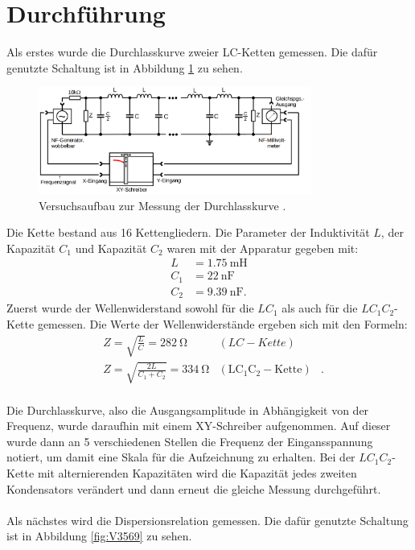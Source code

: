 \documentclass[
  bibliography=totoc,     %
  captions=tableheading,  %
  titlepage=firstiscover, %
]{scrartcl}
\begin{document}
\section{Durchführung}
\label{durchführung}
Als erstes wurde die Durchlasskurve zweier LC-Ketten gemessen. Die dafür
genutzte Schaltung ist in Abbildung \ref{fig:V3568} zu sehen.
\begin{figure}[htb]
  \centering
  \includegraphics[width=0.8\textwidth]{V3568.png}
  \caption{Versuchsaufbau zur Messung der Durchlasskurve \cite{anleitung}.}
  \label{fig:V3568}
\end{figure}
Die Kette bestand aus 16 Kettengliedern.
Die Parameter der Induktivität $L$, der Kapazität $C_1$ und Kapazität
$C_2$ waren mit der Apparatur gegeben mit:
\begin{align}
  L &= \SI{1.75}{\milli\henry} \\
  C_1 &= \SI{22}{\nano\farad} \\
  C_2 &= \SI{9.39}{\nano\farad}.
\end{align}
Zuerst wurde der Wellenwiderstand sowohl für die $LC_1$ als auch für die
$LC_1C_2$-Kette gemessen. Die Werte der Wellenwiderstände ergeben sich mit den
Formeln:
\begin{align}
  &Z =\sqrt{\frac{L}{C}}=\SI{282}{\ohm}&(LC-Kette)& \\
  &Z =\sqrt{\frac{2L}{C_1+C_2}}=\SI{334}{\ohm}&\mathup{(LC_1C_2-Kette)}&. \\
\end{align}

Die Durchlasskurve, also die Ausgangsamplitude in Abhängigkeit von der Frequenz,
wurde daraufhin mit einem XY-Schreiber aufgenommen. Auf
dieser wurde dann an 5 verschiedenen Stellen die Frequenz der Eingansspannung
notiert, um damit eine Skala für die Aufzeichnung zu erhalten.
Bei der $LC_1C_2$-Kette mit alternierenden Kapazitäten wird die Kapazität jedes
zweiten Kondensators verändert und dann erneut die gleiche Messung durchgeführt.\\
\\
Als nächstes wird die Dispersionsrelation gemessen. Die dafür genutzte Schaltung
ist in Abbildung \ref{fig:V3569} zu sehen.
\end{document}
